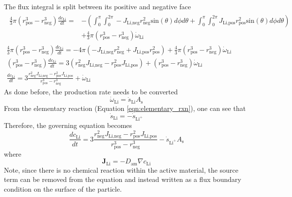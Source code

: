 \documentclass[12pt]{article}
\begin{document}
			The flux integral is split between its positive and negative face
			\begin{gather}
				\begin{split}
					\frac{4}{3} \pi \left( r_\text{pos}^3 - r_\text{neg}^3 \right)\frac{dc_{\text{Li}}}{dt}  = &
					-\left(  \int_{0}^{\pi} \int_{0}^{2\pi} -J_{\text{Li,neg}}  r_\text{neg}^2\text{sin}(\theta) d\phi d\theta  
					+ \int_{0}^{\pi} \int_{0}^{2\pi}  J_{\text{Li,pos}}  r_\text{pos}^2\text{sin}(\theta) d\phi d\theta \right)\\
					&+ \frac{4}{3} \pi \left( r_\text{pos}^3 - r_\text{neg}^3 \right) \dot{\omega}_{\text{Li}}
				\end{split}
				\\
				\frac{4}{3} \pi \left( r_\text{pos}^3 - r_\text{neg}^3 \right)\frac{dc_{\text{Li}}}{dt}  =
				-4\pi\left(   -J_{\text{Li,neg}}  r_\text{neg}^2 + J_{\text{Li,pos}}  r_\text{pos}^2 \right)
				+ \frac{4}{3} \pi \left( r_\text{pos}^3 - r_\text{neg}^3 \right) \dot{\omega}_{\text{Li}}\\
				\left( r_\text{pos}^3 - r_\text{neg}^3 \right)\frac{dc_{\text{Li}}}{dt}  =
				3\left( r_\text{neg}^2  J_{\text{Li,neg}}   - r_\text{pos}^2 J_{\text{Li,pos}}   \right)
				+  \left( r_\text{pos}^3 - r_\text{neg}^3 \right) \dot{\omega}_{\text{Li}}\\
				\frac{dc_{\text{Li}}}{dt}  =
				3\frac{ r_\text{neg}^2  J_{\text{Li,neg}}   - r_\text{pos}^2 J_{\text{Li,pos}}   }{r_\text{pos}^3 - r_\text{neg}^3}
				+  \dot{\omega}_{\text{Li}}
			\end{gather}
			As done before, the production rate needs to be converted
			\begin{equation}
				\dot{\omega}_{\text{Li}} = \dot{s}_{\text{Li}}A_\text{s}
			\end{equation}			
			From the elementary reaction (Equation \ref{eqn:elementary_rxn}), one can see that
			\begin{equation}
				\dot{s}_{\text{Li}} = -\dot{s}_{\text{Li}^+}
			\end{equation}			
			Therefore, the governing equation becomes
			\begin{equation}
				\frac{dc_{\text{Li}}}{dt}  =
				3\frac{ r_\text{neg}^2  J_{\text{Li,neg}}   - r_\text{pos}^2 J_{\text{Li,pos}}   }{r_\text{pos}^3 - r_\text{neg}^3}
				-  \dot{s}_{\text{Li}^+}A_\text{s}
			\end{equation}
			where
			\begin{equation}
				\mathbf{J}_{\text{Li}} = - D_\text{am} \nabla c_{\text{Li}}
			\end{equation}
			Note, since there is no chemical reaction within the active material, the source term can be removed from the equation and instead written as a flux boundary condition on the surface of the particle.
\end{document}
